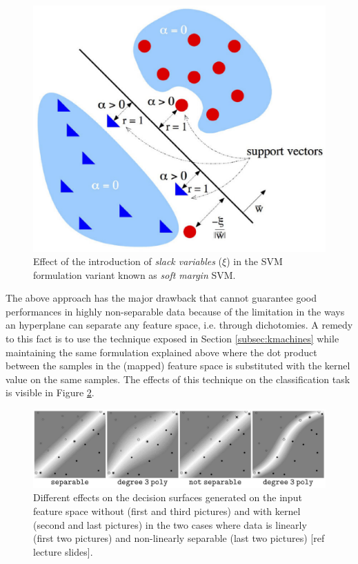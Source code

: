 \begin{figure}[ht]
    \centering
    \includegraphics[scale=0.4]{Figures/slacks2}
    \caption{Effect of the introduction of \emph{slack variables} ($\xi$) in the SVM
    formulation variant known as \emph{soft margin} SVM.}
    \label{fig:slacks}
\end{figure}

The above approach has the major drawback that cannot guarantee good performances
in highly non-separable data because of the limitation in the ways an hyperplane
can separate any feature space, i.e. through dichotomies.
A remedy to this fact is to use the technique exposed in Section \ref{subsec:kmachines}
while maintaining the same formulation explained above where the dot product between
the samples in the (mapped) feature space is substituted with the kernel value on the
same samples.
The effects of this technique on the classification task is visible in Figure \ref{fig:kernsvm}.

\begin{figure}[ht]
    \centering
    \includegraphics[scale=0.3]{Figures/kernsvm}
    \caption{Different effects on the decision surfaces generated on the input
        feature space without (first and third pictures) and with kernel (second and last pictures)
        in the two cases where data is linearly (first two pictures) and non-linearly separable (last two pictures)
        [ref lecture slides].}
    \label{fig:kernsvm}
\end{figure}

